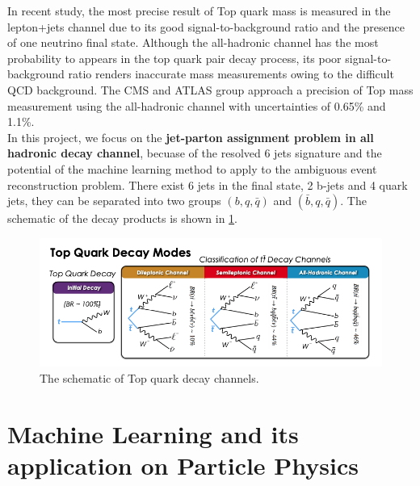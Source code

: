 In recent study, the most precise result of Top quark mass is measured in the lepton+jets channel due to its good signal-to-background ratio and the presence of one neutrino final state.\cite{Mccarthy:2015ucy} Although the all-hadronic channel has the most probability to appears in the top quark pair decay process, its poor signal-to-background ratio renders inaccurate mass measurements owing to the difficult QCD background. The CMS and ATLAS group approach a precision of Top mass measurement using the all-hadronic channel with uncertainties of 0.65\% and 1.1\%.\cite{Sirunyan:2018mlv}\cite{Aaboud:2017mae} 
\\
\newline
In this project, we focus on the \textbf{jet-parton assignment problem in all hadronic decay channel}, becuase of the resolved 6 jets signature and the potential of the machine learning method to apply to the ambiguous event reconstruction problem. There exist 6 jets in the final state, 2 b-jets and 4 quark jets, they can be separated into two groups $\left(b, q, \bar{q}\right)$ and $\left(\bar{b}, q, \bar{q}\right)$. The schematic of the decay products is shown in \ref{fig:ttbardecaymode}. 
\begin{figure}[h]
	\centering
	\includegraphics[width=0.8\linewidth]{Figures/ttbar-decay-mode.png}
	\caption{The schematic of Top quark decay channels.\cite{Mccarthy:2015ucy}}
	\label{fig:ttbardecaymode}
\end{figure}
\section{Machine Learning and its application on Particle Physics}

